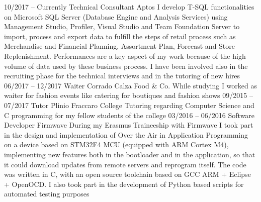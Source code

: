 \documentclass[9pt]{developercv} %
\begin{document}
\begin{entrylist}
	\entry
		{10/2017 -- Currently}
		{Technical Consultant}
		{Aptos}
		{I develop T-SQL functionalities on Microsoft SQL Server (Database Engine and Analysis Services) using Management Studio, Profiler, Visual Studio and Team Foundation Server to import, process and export data to fulfill the steps of retail process such as Merchandise and Financial Planning, Assortment Plan, Forecast and Store Replenishment. Performances are a key aspect of my work because of the high volume of data used by these business process. I have been involved also in the recruiting phase for the technical interviews and in the tutoring of new hires}
		{}
		{}
	\entry
		{06/2017 -- 12/2017}
		{Waiter}
		{Corrado Calza Food \& Co.}
		{While studying I worked as waiter for fashion events like catering for boutiques and fashion shows}
		{}
		{}
	\entry
		{09/2015 -- 07/2017}
		{Tutor}
		{Plinio Fraccaro College}
		{Tutoring regarding Computer Science and C programming for my fellow students of the college}
		{}
		{}
	\entry
		{03/2016 -- 06/2016}
		{Software Developer}
		{Firmwave}
		{During my Erasmus Traineeship with Firmwave I took part in the design and implementation of Over the Air in Application Programming on a device based on STM32F4 MCU (equipped with ARM Cortex M4), implementing new features both in the bootloader and in the application, so that it could download updates from remote servers and reprogram itself. The code was written in C, with an open source toolchain based on GCC ARM + Eclipse + OpenOCD. I also took part in the development of Python based scripts for automated testing purposes}
		{}
		{}
\end{entrylist}


\end{document}

